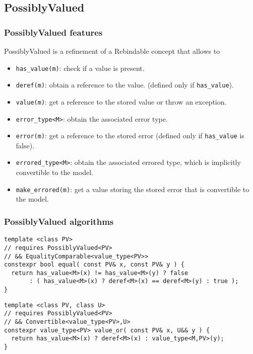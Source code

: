 \documentclass[xcolor=dvipsnames]{beamer}
\newcommand{\cpp}[1]{\lstinline{#1}}
\begin{document}
\subsection{PossiblyValued}
\begin{frame}[fragile]
\frametitle{PossiblyValued features}

PossiblyValued is a refinement of a Rebindable  concept that allows to

\begin{itemize}
  \item \cpp{has_value(m)}: check if a value is present.
  \item \cpp{deref(m)}: obtain a reference to the value. (defined only if \cpp{has_value}).
  \item \cpp{value(m)}: get a reference to the stored value or throw an exception.
  
  \item \cpp{error_type<M>}: obtain the associated error type.
  \item \cpp{error(m)}: get a reference to the stored error (defined only if \cpp{has_value} is false).
  
  \item \cpp{errored_type<M>}: obtain the associated errored type, which is implicitly convertible to the model.
  \item \cpp{make_errored(m)}: get a value storing the stored error that is convertible to the model. 
 
\end{itemize}
\end{frame}
\begin{frame}[fragile]
\frametitle{PossiblyValued algorithms}

\begin{lstlisting}
template <class PV> 
// requires PossiblyValued<PV> 
// && EqualityComparable<value_type<PV>>
constexpr bool equal( const PV& x, const PV& y ) {
  return has_value<M>(x) != has_value<M>(y) ? false 
       : ( has_value<M>(x) ? deref<M>(x) == deref<M>(y) : true );
}
\end{lstlisting}

\begin{lstlisting}
template <class PV, class U> 
// requires PossiblyValued<PV> 
// && Convertible<value_type<PV>,U>
constexpr value_type<PV> value_or( const PV& x, U&& y ) {
  return has_value<M>(x) ? deref<M>(x) : value_type<M,PV>(y); 
}
\end{lstlisting}

\end{frame}
\end{document}
